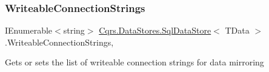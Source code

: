 \subsubsection{\texorpdfstring{Writeable\+Connection\+Strings}{WriteableConnectionStrings}}
{\footnotesize\ttfamily I\+Enumerable$<$string$>$ \hyperlink{classCqrs_1_1DataStores_1_1SqlDataStore}{Cqrs.\+Data\+Stores.\+Sql\+Data\+Store}$<$ T\+Data $>$.Writeable\+Connection\+Strings\hspace{0.3cm}{\ttfamily [get]}, {\ttfamily [protected]}}



Gets or sets the list of writeable connection strings for data mirroring 

